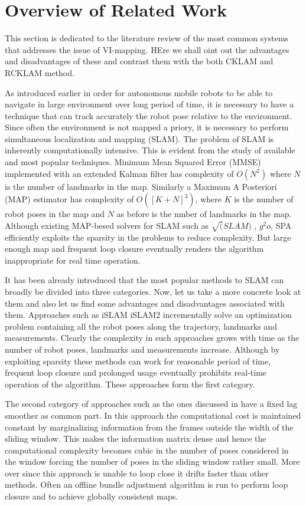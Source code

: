 \section{Overview of Related Work}
This section is dedicated to the literature review of the most common systems that addresses the issue of VI-mapping. HEre we shall oint out the advantages and disadvantages of these and contrast them with the both CKLAM and RCKLAM method.
 
As introduced earlier in order for autonomous mobile robots to be able to navigate in large environment over long period of time, it is necessary to have a technique that can track accurately the robot pose relative to the environment. Since often the environment is not mapped a priory, it is necessary to perform simultaneous localization and mapping (SLAM). The problem of SLAM is inherently computationally intensive. This is evident from the study of available and most popular techniques. Minimum Mean Squared Error (MMSE)\cite{EkFSLAM} implemented with an extended Kalman filter has complexity of $O(N^2)$ where $N$ is the number of landmarks in the map. Similarly a Maximum A Posteriori (MAP) estimator\cite{FULL-BA-BASED} has complexity of $O([K+N]^3)$, where $K$ is the number of robot poses in the map and $N$ as before is the nmber of landmarks in the map. Although existing MAP-besed solvers for SLAM such as $\sqrt(SLAM)$ \cite{FULL-BA-BASED}, $g^2o$\cite{g2o}, SPA \cite{spaBYkonolige} efficiently exploits the sparsity in the problems to reduce complexity. But large enough map and frequent loop closure eventually renders the algorithm inappropriate for real time operation.

It has been already introduced that the most popular methods to SLAM can broadly be divided into three categories. Now, let us take a more concrete look at them and also let us find some advantages and disadvantages associated with them. Approaches such as iSLAM\cite{Kaess08thesis} iSLAM2\cite{Kaess01022012} incrementally solve an optimization problem containing all the robot poses along the trajectory, landmarks and measurements. Clearly the complexity in such approaches grows with time as the number of robot poses, landmarks and measurements increase. Although by exploiting sparsity these methods can work for reasonable period of time, frequent loop closure and prolonged usage eventually prohibits real-time operation of the algorithm. These approaches form the first category.

The second category of approaches such as the ones discussed in \cite {Sibley:2010, 4801600} have a fixed lag smoother as common part. In this approach the computational cost is maintained constant by marginalizing information from the frames outside the width of the sliding window. This makes the information matrix dense and hence the computational complexity becomes cubic in the number of poses considered in the window forcing the number of poses in the sliding window rather small. More over since this approach is unable to loop close it drifts faster than other methods. Often an offline bundle adjustment algorithm is run to perform loop closure and to achieve globally consistent maps.

